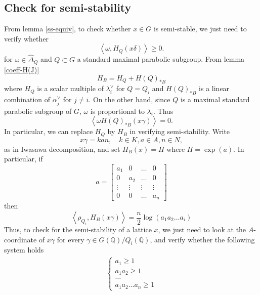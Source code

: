 \subsection{Check for semi-stability}\label{semi-stable-verified}
From lemma \ref{ss-equiv}, to check whether $x \in G$ is semi-stable, we just need to verify whether $$\left\langle \omega,H_Q(x\delta)\right\rangle \ge 0.$$
for $\omega \in \widehat{\Delta}_Q$ and $Q \subset G$ a standard maximal parabolic subgroup.
From lemma \ref{coeff-H(J)}
\[H_B = H_Q+H(Q)_{\ast B}\]
where $H_Q$ is a scalar multiple of $\lambda_i^\vee$ for $Q = Q_i$ and $H(Q)_{\ast B}$ is a linear combination of $\alpha_j^\vee$ for $ j \ne i$.
On the other hand, since $Q$ is a maximal standard parabolic subgroup of $G$,
$\omega$ is proportional to $\lambda_i.$ Thus $$\left\langle \omega H(Q)_{\ast B}(x\gamma)\right\rangle =0.$$ In particular, we can replace $H_Q$ by $H_B$ in verifying semi-stability.
Write
\[ x\gamma = kan, \quad k \in K, a \in A, n \in N,\]
as in Iwasawa decomposition, and set $H_B(x) = H$ where $H = \exp(a)$. In particular, if
\[a = \begin{bmatrix}
        a_1    & 0      & \ldots & 0      \\
        0      & a_2    & \ldots & 0      \\
        \vdots & \vdots & \vdots & \vdots \\
        0      & 0      & \ldots & a_n
    \end{bmatrix}\]
then
\begin{equation}
    \left\langle \rho_{Q_i}, H_B(x\gamma) \right\rangle = \dfrac{n}{2}\log(a_1a_2\ldots a_i) \label{volume - H_P}
\end{equation}
Thus, to check for the semi-stability of a lattice $x$, we just need to look at the
$A$-coordinate of $x\gamma$ for every $\gamma \in G(\mathbb{Q})/Q_i(\mathbb{Q})$, and verify whether the following system holds
\begin{align*}
    \begin{cases}
        a_1 \ge 1   \\
        a_1a_2\ge 1 \\
        \ldots      \\
        a_1a_2\ldots a_n \ge 1
    \end{cases}
\end{align*}
